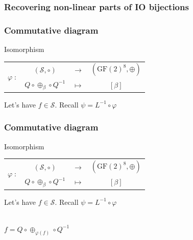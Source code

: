 \documentclass{beamer}
\newcommand{\gf}{\ensuremath{\text{GF}\left(2\right)}}
\begin{document}
\subsubsection{Recovering non-linear parts of IO bijections}
\begin{frame}\frametitle{Commutative diagram}
    \begin{block}{Isomorphism}
    \begin{center}
    \begin{tabular}{ r  c c c }
	\multirow{2}{*}{$\varphi \; :$} & $(\mathcal{S}, \circ )$  & $\longrightarrow$ & $(\gf^8, \oplus)$ \\
	                                & $Q \circ \oplus_{\beta} \circ Q^{-1} $ & $\longmapsto$ & $\left[ \beta \right]$
    \end{tabular}
    \end{center}
    \end{block}
    
    \medskip
    Let's have $f \in \mathcal{S}$. Recall $\psi = L^{-1} \circ \varphi$ \\
    \bigskip
    
\end{frame}

\begin{frame}\frametitle{Commutative diagram}
    \begin{block}{Isomorphism}
    \begin{center}
    \begin{tabular}{ r  c c c }
	\multirow{2}{*}{$\varphi \; :$} & $(\mathcal{S}, \circ )$  & $\longrightarrow$ & $(\gf^8, \oplus)$ \\
	                                & $Q \circ \oplus_{\beta} \circ Q^{-1} $ & $\longmapsto$ & $\left[ \beta \right]$
    \end{tabular}
    \end{center}
    \end{block}
    
    \medskip
    Let's have $f \in \mathcal{S}$. Recall $\psi = L^{-1} \circ \varphi$ \\
    \bigskip
    
    \\
    $f = Q \circ \oplus_{\varphi(f)} \circ Q^{-1} $
\end{frame}
\end{document}
